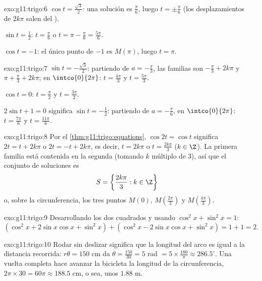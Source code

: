\begin{solution}{exo:g11:trigo:6}
$\cos t = \frac{\sqrt3}{2}$: una solución es $\frac\pi6$, luego
$t = \pm\frac\pi6$ (los desplazamientos de $2k\pi$ salen del ).

$\sin t = \frac12$: $t = \frac\pi6$ o $t = \pi - \frac\pi6 =
\frac{5\pi}{6}$.

$\cos t = -1$: el único punto de  $-1$ es $M(\pi)$, luego
$t = \pi$.
\end{solution}

\begin{solution}{exo:g11:trigo:7}
$\sin t = -\frac{\sqrt3}{2}$: partiendo de $a = -\frac\pi3$, las familias
son $-\frac\pi3 + 2k\pi$ y $\pi + \frac\pi3 + 2k\pi$; en
$\intco{0}{2\pi}$: $t = \frac{4\pi}{3}$ y $t = \frac{5\pi}{3}$.

$\cos t = 0$: $t = \frac\pi2$ y $t = \frac{3\pi}{2}$.

$2\sin t + 1 = 0$ significa $\sin t = -\frac12$: partiendo de
$a = -\frac\pi6$, en $\intco{0}{2\pi}$: $t = \frac{7\pi}{6}$ y
$t = \frac{11\pi}{6}$.
\end{solution}

\begin{solution}{exo:g11:trigo:8}
Por el \cref{thm:g11:trigo:equations}, $\cos 2t = \cos t$ significa
$2t = t + 2k\pi$ o $2t = -t + 2k\pi$, es decir, $t = 2k\pi$ o
$t = \frac{2k\pi}{3}$ ($k \in \Z$). La primera familia está contenida en
la segunda (tomando $k$ múltiplo de $3$), así que el conjunto de
soluciones es
\[
S = \left\{\frac{2k\pi}{3} : k \in \Z\right\}
\]
o, sobre la circunferencia, los tres puntos $M(0)$,
$M\!\left(\frac{2\pi}{3}\right)$ y $M\!\left(\frac{4\pi}{3}\right)$.
\end{solution}

\begin{solution}{exo:g11:trigo:9}
Desarrollando los dos cuadrados y usando $\cos^2 x + \sin^2 x = 1$:
\[
(\cos^2 x + 2\sin x\cos x + \sin^2 x)
+ (\cos^2 x - 2\sin x\cos x + \sin^2 x)
= 1 + 1 = 2 .
\]
\end{solution}

\begin{solution}{exo:g11:trigo:10}
Rodar sin deslizar significa que la longitud del arco es igual a la
distancia recorrida: $r\theta = 150$ cm da
$\theta = \frac{150}{30} = 5$ rad $= 5 \times \frac{180}{\pi} \approx
286.5^\circ$. Una vuelta completa hace avanzar la bicicleta la longitud de
la circunferencia, $2\pi \times 30 = 60\pi \approx 188.5$ cm, o sea, unos
$1.88$ m.
\end{solution}

